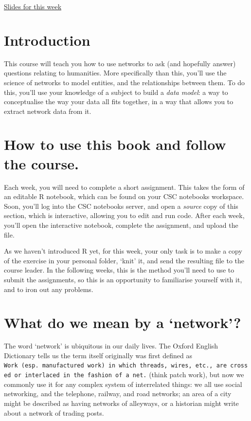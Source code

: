 \documentclass[
]{book}
\begin{document}
\href{https://comhis.github.io/applying-network-analysis-to-humanities/slides/1-1-introduction.html\#/title-slide}{Slides for this week}

\hypertarget{introduction}{%
\section{Introduction}\label{introduction}}

This course will teach you how to use networks to ask (and hopefully answer) questions relating to humanities. More specifically than this, you'll use the science of networks to model entities, and the relationships between them. To do this, you'll use your knowledge of a subject to build a \emph{data model}: a way to conceptualise the way your data all fits together, in a way that allows you to extract network data from it.

\hypertarget{how-to-use-this-book-and-follow-the-course.}{%
\section{How to use this book and follow the course.}\label{how-to-use-this-book-and-follow-the-course.}}

Each week, you will need to complete a short assignment. This takes the form of an editable R notebook, which can be found on your CSC notebooks workspace. Soon, you'll log into the CSC notebooks server, and open a \emph{source} copy of this section, which is interactive, allowing you to edit and run code. After each week, you'll open the interactive notebook, complete the assignment, and upload the file.

As we haven't introduced R yet, for this week, your only task is to make a copy of the exercise in your personal folder, `knit' it, and send the resulting file to the course leader. In the following weeks, this is the method you'll need to use to submit the assignments, so this is an opportunity to familiarise yourself with it, and to iron out any problems.

\hypertarget{what-do-we-mean-by-a-network}{%
\section{What do we mean by a `network'?}\label{what-do-we-mean-by-a-network}}

The word `network' is ubiquitous in our daily lives. The Oxford English Dictionary tells us the term itself originally was first defined as \texttt{Work\ (esp.\ manufactured\ work)\ in\ which\ threads,\ wires,\ etc.,\ are\ crossed\ or\ interlaced\ in\ the\ fashion\ of\ a\ net.} (think patch work), but now we commonly use it for any complex system of interrelated things: we all use social networking, and the telephone, railway, and road networks; an area of a city might be described as having networks of alleyways, or a historian might write about a network of trading posts.
\end{document}
